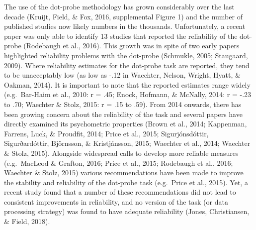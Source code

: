 \documentclass[english,,man,floatsintext]{apa6}
\begin{document}
The use of the dot-probe methodology has grown considerably over the last decade (Kruijt, Field, \& Fox, 2016, supplemental Figure 1) and the number of published studies now likely numbers in the thousands. Unfortunately, a recent paper was only able to identify 13 studies that reported the reliability of the dot-probe (Rodebaugh et al., 2016). This growth was in spite of two early papers highlighted reliability problems with the dot-probe (Schmukle, 2005; Staugaard, 2009). Where reliability estimates for the dot-probe task are reported, they tend to be unacceptably low (as low as -.12 in Waechter, Nelson, Wright, Hyatt, \& Oakman, 2014). It is important to note that the reported estimates range widely (e.g.~Bar-Haim et al., 2010: r = .45; Enock, Hofmann, \& McNally, 2014: r = -.23 to .70; Waechter \& Stolz, 2015: r = .15 to .59). From 2014 onwards, there has been growing concern about the reliability of the task and several papers have directly examined its psychometric properties (Brown et al., 2014; Kappenman, Farrens, Luck, \& Proudfit, 2014; Price et al., 2015; Sigurjónsdóttir, Sigurðardóttir, Björnsson, \& Kristjánsson, 2015; Waechter et al., 2014; Waechter \& Stolz, 2015). Alongside widespread calls to develop more reliable measures (e.g.~MacLeod \& Grafton, 2016; Price et al., 2015; Rodebaugh et al., 2016; Waechter \& Stolz, 2015) various recommendations have been made to improve the stability and reliability of the dot-probe task (e.g.~Price et al., 2015). Yet, a recent study found that a number of these recommendations did not lead to consistent improvements in reliability, and no version of the task (or data processing strategy) was found to have adequate reliability (Jones, Christiansen, \& Field, 2018).
\end{document}
